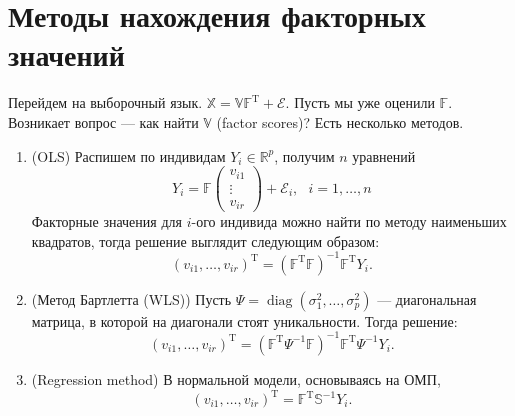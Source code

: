 \documentclass[specialist, 12pt,
subf, %
href, colorlinks=true,
substylefile = spbu.rtx,
]{disser}
\DeclareMathOperator{\diag}{diag}
\begin{document}
\section{Методы нахождения факторных значений}

Перейдем на выборочный язык. $\mathbb{X}=\mathbb{V}\mathbb{F}^\mathrm{T}+\mathcal{E}.$ Пусть мы уже оценили $\mathbb{F}$. Возникает вопрос --- как найти $\mathbb{V}$ (factor scores)? Есть несколько методов.
\begin{enumerate}
	\item (OLS) Распишем по индивидам $Y_i \in \mathbb{R}^p$, получим $n$ уравнений
	\begin{equation*}
	Y_i = \mathbb{F} \left( \begin{matrix}
	v_{i1} \\
	\vdots \\
	v_{ir}
	 \end{matrix} \right) + \mathcal{E}_i, ~~~ i=1,\ldots,n
	\end{equation*}
	Факторные значения для $i$-ого индивида можно найти по методу наименьших квадратов, тогда решение выглядит следующим образом:
	\begin{equation*}
	(v_{i1},\ldots,v_{ir})^\mathrm{T} = (\mathbb{F}^\mathrm{T}\mathbb{F})^{-1}\mathbb{F}^\mathrm{T}Y_i.
	\end{equation*}
	
	\item (Метод Бартлетта (WLS)) Пусть $\Psi = \diag(\sigma_1^2, \ldots, \sigma_p^2)$ --- диагональная матрица, в которой на диагонали стоят уникальности. Тогда решение:
	\begin{equation*}
	(v_{i1},\ldots,v_{ir})^\mathrm{T} = (\mathbb{F}^\mathrm{T}\Psi^{-1}\mathbb{F})^{-1}\mathbb{F}^\mathrm{T}\Psi^{-1}Y_i.
	\end{equation*}
	
	\item (Regression method) В нормальной модели, основываясь на ОМП,
		\begin{equation*}
	(v_{i1},\ldots,v_{ir})^\mathrm{T} = \mathbb{F}^\mathrm{T}\mathbb{S}^{-1}Y_i.
	\end{equation*}
	
\end{enumerate}
\end{document}
